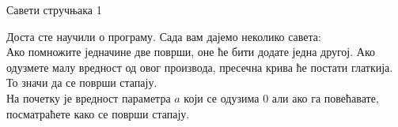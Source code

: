 \documentclass[sr]{./../../common/SurferDesc}%
\begin{document}
\footnotesize
%

\begin{surferPage}
  \begin{surferTitle}Савети стручњака 1\end{surferTitle}
   \begin{surferText}

Доста сте научили о програму. Сада вам дајемо неколико савета:\\
\vspace{0.3cm}
Ако помножите једначине две површи, оне ће бити додате једна другој. Ако одузмете малу вредност од овог производа, пресечна крива ће постати глаткија. То значи да се површи стапају.\\
\vspace{0.3cm}
На почетку је вредност параметра $a$ који се одузима 0 али ако га повећавате, посматраћете како се површи стапају.

   \end{surferText}
\end{surferPage}

 
\end{document}

